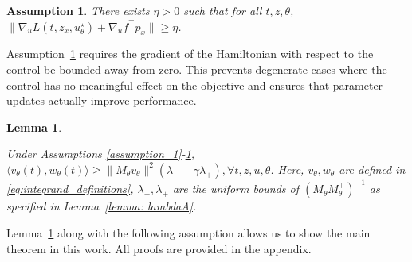 \documentclass[letterpaper, 10 pt, conference]{ieeeconf}  %
\newtheorem{assumption}{Assumption}
\newtheorem{lemma}{Lemma}
\begin{document}
    \begin{assumption}
    There exists $\eta > 0$ such that for all $t,z,\theta$, $\|\nabla_uL(t,z_x,u_\theta^\star) + \nabla_uf^{\top}p_x\| \geq \eta$. 
    \label{assumption_dhdu}
    \end{assumption}
    Assumption~\ref{assumption_dhdu} requires the gradient of the Hamiltonian with respect to the control be bounded away from zero. This prevents degenerate cases where the control has no meaningful effect on the objective and ensures that parameter updates actually improve performance.


        \newcommand{\lemmaPositiveInnerProduct}[1]{
    Under Assumptions \ref{assumption_1}-\ref{assumption_dhdu}, $ \langle v_\theta(t),w_\theta(t)\rangle \geq \|M_\theta v_\theta\|^2 (\lambda_- - \gamma \lambda_+) , \forall t,z,u,\theta$. Here, $v_\theta, w_\theta$ are defined in \eqref{eq:integrand_definitions}, $\lambda_-, \lambda_+$ are the uniform bounds of $\left( M_\theta M_\theta^\top \right)^{-1}$ as specified in Lemma~\ref{lemma: lambdaA}.}
    \begin{lemma}
    \label{lemma:positive_inner_product}
    \lemmaPositiveInnerProduct{main}
    \end{lemma}
    
    Lemma~\ref{lemma:positive_inner_product} along with the following assumption allows us to show the main theorem in this work. All proofs are provided in the appendix.
    
\end{document}
